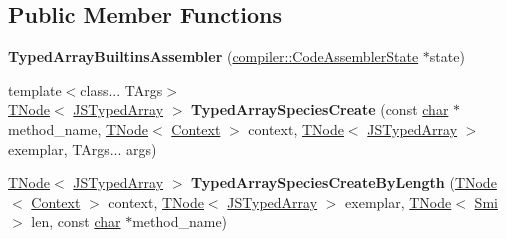 \subsection*{Public Member Functions}
\begin{DoxyCompactItemize}
\item 
\mbox{\label{classv8_1_1internal_1_1TypedArrayBuiltinsAssembler_a6bfa8f418ce2a500ed193514b6ab6673}} 
{\bfseries Typed\+Array\+Builtins\+Assembler} (\mbox{\hyperlink{classv8_1_1internal_1_1compiler_1_1CodeAssemblerState}{compiler\+::\+Code\+Assembler\+State}} $\ast$state)
\item 
\mbox{\label{classv8_1_1internal_1_1TypedArrayBuiltinsAssembler_a3b2b542fac15db87593b39f933eb35d9}} 
{\footnotesize template$<$class... T\+Args$>$ }\\\mbox{\hyperlink{classv8_1_1internal_1_1compiler_1_1TNode}{T\+Node}}$<$ \mbox{\hyperlink{classv8_1_1internal_1_1JSTypedArray}{J\+S\+Typed\+Array}} $>$ {\bfseries Typed\+Array\+Species\+Create} (const \mbox{\hyperlink{classchar}{char}} $\ast$method\+\_\+name, \mbox{\hyperlink{classv8_1_1internal_1_1compiler_1_1TNode}{T\+Node}}$<$ \mbox{\hyperlink{classv8_1_1internal_1_1Context}{Context}} $>$ context, \mbox{\hyperlink{classv8_1_1internal_1_1compiler_1_1TNode}{T\+Node}}$<$ \mbox{\hyperlink{classv8_1_1internal_1_1JSTypedArray}{J\+S\+Typed\+Array}} $>$ exemplar, T\+Args... args)
\item 
\mbox{\label{classv8_1_1internal_1_1TypedArrayBuiltinsAssembler_a9d2d718e56288df53007d55744c5c5ac}} 
\mbox{\hyperlink{classv8_1_1internal_1_1compiler_1_1TNode}{T\+Node}}$<$ \mbox{\hyperlink{classv8_1_1internal_1_1JSTypedArray}{J\+S\+Typed\+Array}} $>$ {\bfseries Typed\+Array\+Species\+Create\+By\+Length} (\mbox{\hyperlink{classv8_1_1internal_1_1compiler_1_1TNode}{T\+Node}}$<$ \mbox{\hyperlink{classv8_1_1internal_1_1Context}{Context}} $>$ context, \mbox{\hyperlink{classv8_1_1internal_1_1compiler_1_1TNode}{T\+Node}}$<$ \mbox{\hyperlink{classv8_1_1internal_1_1JSTypedArray}{J\+S\+Typed\+Array}} $>$ exemplar, \mbox{\hyperlink{classv8_1_1internal_1_1compiler_1_1TNode}{T\+Node}}$<$ \mbox{\hyperlink{classv8_1_1internal_1_1Smi}{Smi}} $>$ len, const \mbox{\hyperlink{classchar}{char}} $\ast$method\+\_\+name)
\item 
\mbox{\label{classv8_1_1internal_1_1TypedArrayBuiltinsAssembler_a8411ceb4d9daf5c498f893b43dea49ca}} 

\end{DoxyCompactItemize}

